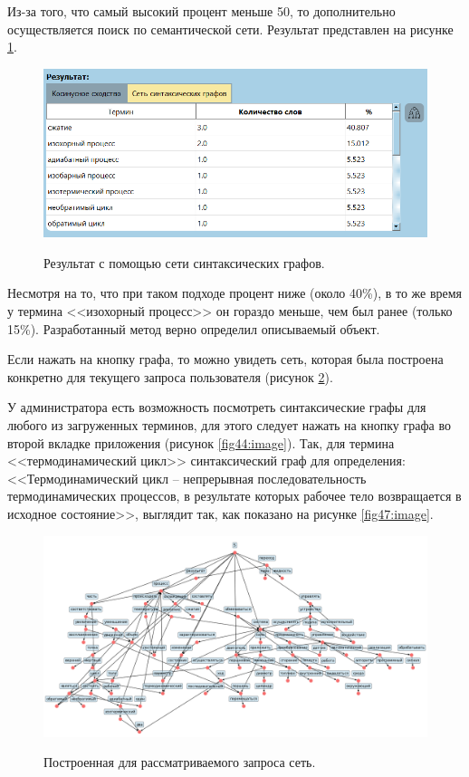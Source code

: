 Из-за того, что самый высокий процент меньше 50, то дополнительно осуществляется поиск по семантической сети. Результат представлен на рисунке \ref{fig45:image}.
\begin{figure}[h]
	\begin{center}
		{\includegraphics[scale = 0.6]{img/examples/ex1_3.png}}
		\caption{Результат с помощью сети синтаксических графов.}
		\label{fig45:image}
	\end{center}
\end{figure}

Несмотря на то, что при таком подходе процент ниже (около 40\%), в то же время у термина <<изохорный процесс>> он гораздо меньше, чем был ранее (только 15\%). Разработанный метод верно определил описываемый объект.

Если нажать на кнопку графа, то можно увидеть сеть, которая была построена конкретно для текущего запроса пользователя (рисунок \ref{fig46:image}).

У администратора есть возможность посмотреть синтаксические графы для любого из загруженных терминов, для этого следует нажать на кнопку графа во второй вкладке приложения (рисунок \ref{fig44:image}). Так, для термина <<термодинамический цикл>> синтаксический граф для определения: <<Термодинамический цикл -- непрерывная последовательность термодинамических процессов, в результате которых рабочее тело возвращается в исходное состояние>>, выглядит так, как показано на рисунке \ref{fig47:image}.
\begin{figure}[pt!]
	\begin{center}
		{\includegraphics[scale = 0.55, angle=90]{img/examples/ex1_4.png}}
		\caption{Построенная для рассматриваемого запроса сеть.}
		\label{fig46:image}
	\end{center}
\end{figure}

